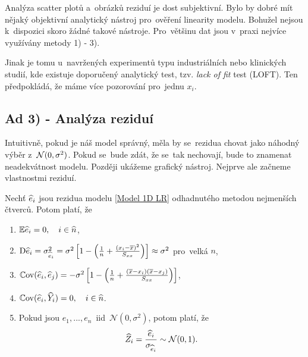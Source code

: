 \begin{example}
\begin{enumerate}[1)]
	
\end{enumerate}	
	
\end{example}
\begin{example}
	Analýza scatter plotů a~obrázků reziduí je dost subjektivní. Bylo by dobré mít nějaký objektivní analytický nástroj pro~ověření linearity modelu. Bohužel nejsou k~dispozici skoro žádné takové nástroje. Pro~většinu dat jsou v~praxi nejvíce využívány metody 1) - 3).
	
	Jinak je tomu u~navržených experimentů typu industriálních nebo klinických studií, kde existuje doporučený analytický test, tzv. \textit{lack of fit} test (LOFT). Ten předpokládá, že máme více pozorování pro~jednu $x_i$.
\end{example}

\subsection*{Ad 3) - Analýza reziduí}
Intuitivně, pokud je náš model správný, měla by se~rezidua chovat jako náhodný výběr z~$\mathcal{N}(0,\sigma^2)$. Pokud se~bude zdát, že se~tak nechovají, bude to znamenat neadekvátnost modelu. Později ukážeme grafický nástroj. Nejprve ale začneme vlastnostmi reziduí.\newcommand{\hx}{\overline{x}}
\newcommand{\hej}{\widehat{e}_j}
\newcommand{\Nn}{\mathcal{N}(0,\sigma^2)}
\newcommand{\hZi}{\widehat{Z}_i}
\newcommand{\hzi}{\widehat{z}_i}
\newcommand{\model}{\wbeta_0 + \wbeta_1 x_i}
\newcommand{\hYj}{\widehat{Y}_j}
\newcommand{\hr}{\widehat{r}}

\begin{theorem}
	Nechť $\widehat{e}_i$ jsou rezidua modelu \eqref{Model 1D LR} odhadnutého metodou nejmenších čtverců. Potom platí, že
	\begin{enumerate}
		\item $\mathbb{E} \widehat{e}_i = 0, \quad i\in\widehat{n} $,
		\item $\D \hei = \sigma_{\hei}^2 = \sigma^2 \left[1 - \left(\frac{1}{n} + \frac{(x_i - \hx)^2}{\Sxx} \right) \right] \approx \sigma^2$ pro~velká $n$,
		\item $\Cov (\hei, \hej) = -\sigma^2 \left[1 - \left(\frac{1}{n} + \frac{(\hx - x_i)(\hx - x_j)}{\Sxx} \right) \right]$,
		\item $\mathbb{C}\mathrm{ov}(\widehat{e}_i, \widehat{Y}_i) = 0, \quad i\in\widehat{n} $.
		\item Pokud jsou $e_1,..., e_n$~iid~$\Nn$, potom platí, že
		 $$
			\hZi = \frac{\hei}{\sigma_{\hei}} \sim \NN (0,1).
		 $$
	\end{enumerate}
\end{theorem}


